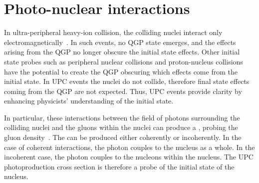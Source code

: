 \chapter{Photo-nuclear interactions \label{ch:photoNuc}}
    In ultra-peripheral heavy-ion collision, the colliding nuclei interact only 
      electromagnetically~\cite{Baltz:2007kq,Bertulani:2005ru}.   
    In such events, no QGP state emerges, and the effects arising from the QGP 
      no longer obscure the initial state effects.
    Other initial state probes such as peripheral nuclear collisions and 
      proton-nucleus collisions have the potential to create the QGP obscuring 
      which effects come from the initial state.
    In UPC events the nuclei do not collide, therefore final state effects coming
      from the QGP are not expected. 
    Thus, UPC events provide clarity by enhancing physicists' 
      understanding of the initial state. 
    
    In particular, these interactions between the field of photons surrounding 
      the colliding nuclei and the gluons within the nuclei can produce a 
      \JPsi{}, probing the gluon density~\cite{Ryskin:1992ui,Brodsky:1994kf}.
    The \JPsi{} can be produced either coherently or incoherently. 
    In the case of coherent interactions, the photon couples to the nucleus 
      as a whole.
    In the incoherent case, the photon couples to the nucleons within the 
      nucleus.
    The UPC \JPsi{} photoproduction cross section is therefore a probe of 
      the initial state of the nucleus.

